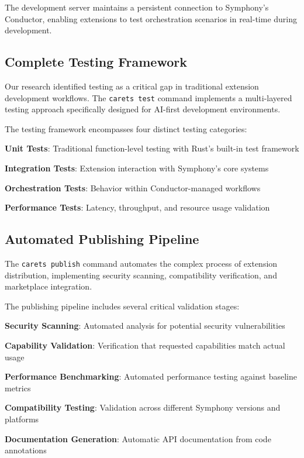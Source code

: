 \begin{alertbox}
The development server maintains a persistent connection to Symphony's Conductor, enabling extensions to test orchestration scenarios in real-time during development.
\end{alertbox}

\subsection*{Complete Testing Framework}

Our research identified testing as a critical gap in traditional extension development workflows. The \texttt{carets test} command implements a multi-layered testing approach specifically designed for AI-first development environments.

The testing framework encompasses four distinct testing categories:

\begin{compactlist}
    \item \textbf{Unit Tests}: Traditional function-level testing with Rust's built-in test framework
    \item \textbf{Integration Tests}: Extension interaction with Symphony's core systems
    \item \textbf{Orchestration Tests}: Behavior within Conductor-managed workflows
    \item \textbf{Performance Tests}: Latency, throughput, and resource usage validation
\end{compactlist}

\subsection*{Automated Publishing Pipeline}

The \texttt{carets publish} command automates the complex process of extension distribution, implementing security scanning, compatibility verification, and marketplace integration.

The publishing pipeline includes several critical validation stages:

\begin{expandedlist}
    \item \textbf{Security Scanning}: Automated analysis for potential security vulnerabilities
    \item \textbf{Capability Validation}: Verification that requested capabilities match actual usage
    \item \textbf{Performance Benchmarking}: Automated performance testing against baseline metrics
    \item \textbf{Compatibility Testing}: Validation across different Symphony versions and platforms
    \item \textbf{Documentation Generation}: Automatic API documentation from code annotations
\end{expandedlist}

